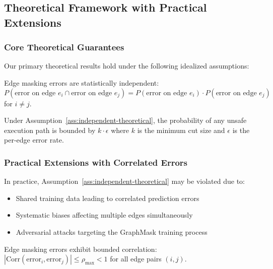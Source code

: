 \documentclass{article}
\begin{document}
\subsection{Theoretical Framework with Practical Extensions}
\label{sec:practical-extensions}

\subsubsection{Core Theoretical Guarantees}

Our primary theoretical results hold under the following idealized assumptions:

\begin{assumption}
\label{ass:independent-theoretical}
Edge masking errors are statistically independent: $P(\text{error on edge } e_i \cap \text{error on edge } e_j) = P(\text{error on edge } e_i) \cdot P(\text{error on edge } e_j)$ for $i \neq j$.
\end{assumption}

\begin{theorem}
\label{thm:safety-theoretical}
Under Assumption~\ref{ass:independent-theoretical}, the probability of any unsafe execution path is bounded by $k \cdot \epsilon$ where $k$ is the minimum cut size and $\epsilon$ is the per-edge error rate.
\end{theorem}

\subsubsection{Practical Extensions with Correlated Errors}

In practice, Assumption~\ref{ass:independent-theoretical} may be violated due to:
\begin{itemize}
\item Shared training data leading to correlated prediction errors
\item Systematic biases affecting multiple edges simultaneously  
\item Adversarial attacks targeting the GraphMask training process
\end{itemize}

\begin{assumption}
\label{ass:bounded-correlation}
Edge masking errors exhibit bounded correlation: $|\mathrm{Corr}(\text{error}_i, \text{error}_j)| \leq \rho_{\max} < 1$ for all edge pairs $(i,j)$.
\end{assumption}
\end{document}
